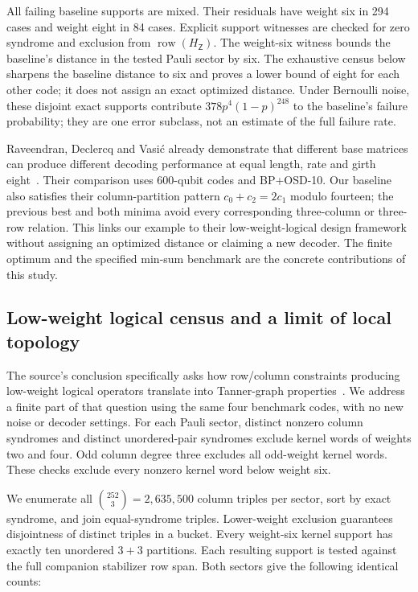 \documentclass[11pt]{article}
\theoremstyle{definition}
\theoremstyle{remark}
\newcommand{\HZ}{H_{\mathsf Z}}
\newcommand{\row}{\operatorname{row}}
\begin{document}
All failing baseline supports are mixed. Their residuals have weight
six in 294 cases and weight eight in 84 cases. Explicit support
witnesses are checked for zero syndrome and exclusion from
$\row(\HZ)$. The weight-six witness bounds the baseline's distance
in the tested Pauli sector by six. The exhaustive census below sharpens the baseline distance to six and
proves a lower bound of eight for each other code; it does not assign an
exact optimized distance. Under Bernoulli noise, these disjoint exact supports
contribute $378p^4(1-p)^{248}$ to the baseline's failure probability;
they are one error subclass, not an estimate of the full failure rate.

Raveendran, Declercq and Vasi\'c already demonstrate that different
base matrices can produce different decoding performance at equal
length, rate and girth eight~\cite[Sec.~V-A, Eq.~(92), Fig.~1]{RDV2025}.
Their comparison uses 600-qubit codes and BP+OSD-10. Our baseline
also satisfies their column-partition pattern $c_0+c_2=2c_1$ modulo
fourteen; the previous best and both minima avoid every corresponding
three-column or three-row relation. This links our example to their
low-weight-logical design framework without assigning an optimized
distance or claiming a new decoder. The finite optimum and the
specified min-sum benchmark are the concrete contributions of this study.

\subsection{Low-weight logical census and a limit of local topology}\label{sec:logical-census}

The source's conclusion specifically asks how row/column constraints
producing low-weight logical operators translate into Tanner-graph
properties~\cite{FHM2026,RDV2025}. We address a finite part of that question
using the same four benchmark codes, with no new noise or decoder settings.
For each Pauli sector, distinct nonzero column syndromes and distinct
unordered-pair syndromes exclude kernel words of weights two and four.
Odd column degree three excludes all odd-weight kernel words. These checks
exclude every nonzero kernel word below weight six.

We enumerate all $\binom{252}{3}=2{,}635{,}500$ column triples per sector,
sort by exact syndrome, and join equal-syndrome triples. Lower-weight
exclusion guarantees disjointness of distinct triples in a bucket.
Every weight-six kernel support has exactly ten unordered $3+3$
partitions. Each resulting support is tested against the full companion
stabilizer row span. Both sectors give the following identical counts:
\end{document}
